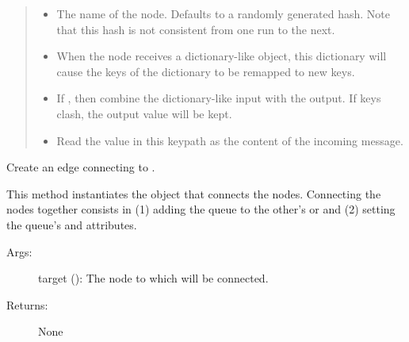 \documentclass[letterpaper,10pt,english]{sphinxmanual}
\begin{document}
\begin{fulllineitems}
\begin{quote}
\begin{description}
\begin{itemize}
\item {} 
 \textendash{} The name of the node. Defaults to a randomly generated hash.
Note that this hash is not consistent from one run to the next.

\item {} 
 \textendash{} When the node receives a dictionary-like object,
this dictionary will cause the keys of the dictionary to be remapped
to new keys.

\item {} 
 \textendash{} If , then combine the dictionary-like input
with the output. If keys clash, the output value will be kept.

\item {} 
 \textendash{} Read the value in this keypath as the content
of the incoming message.

\end{itemize}

\end{description}\end{quote}

\begin{fulllineitems}
\label{\detokenize{api:nanostream.node.NanoNode.add_edge}}
Create an edge connecting  to .

This method instantiates the  object that connects the
nodes. Connecting the nodes together consists in (1) adding the queue to 
the other’s  or  and (2) setting
the queue’s  and  attributes.
\begin{description}
\item[{Args:}] \leavevmode
target (): The node to which  will be connected.

\item[{Returns:}] \leavevmode
None

\end{description}


\end{fulllineitems}
\end{fulllineitems}
\end{document}
